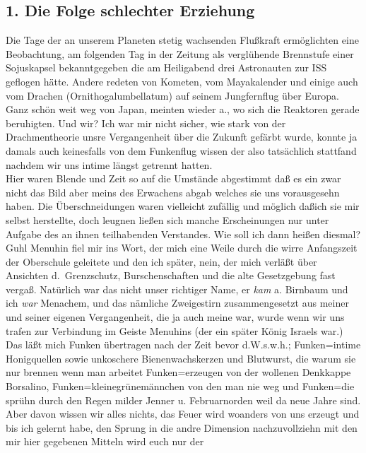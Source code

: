 \documentclass[
]{article}
\author{}
\date{\vspace{-2.5em}}
\begin{document}
\subsection{1. Die Folge schlechter
Erziehung}\label{die-folge-schlechter-erziehung}

Die Tage der an unserem Planeten stetig wachsenden Flußkraft
ermöglichten eine Beobachtung, am folgenden Tag in der Zeitung als
verglühende Brennstufe einer Sojuskapsel bekanntgegeben die am
Heiligabend drei Astronauten zur ISS geflogen hätte. Andere redeten von
Kometen, vom Mayakalender und einige auch vom Drachen
(Ornithogalumbellatum) auf seinem Jungfernflug über Europa. Ganz schön
weit weg von Japan, meinten wieder a., wo sich die Reaktoren gerade
beruhigten. Und wir? Ich war mir nicht sicher, wie stark von der
Drachmentheorie unsre Vergangenheit über die Zukunft gefärbt wurde,
konnte ja damals auch keinesfalls von dem Funkenflug wissen der also
tatsächlich stattfand nachdem wir uns intime längst getrennt hatten.\\
Hier waren Blende und Zeit so auf die Umstände abgestimmt daß es ein
zwar nicht das Bild aber meins des Erwachens abgab welches sie uns
vorausgesehn haben. Die Überschneidungen waren vielleicht zufällig und
möglich daßich sie mir selbst herstellte, doch leugnen ließen sich
manche Erscheinungen nur unter Aufgabe des an ihnen teilhabenden
Verstandes. Wie soll ich dann heißen diesmal?\\
Guhl Menuhin fiel mir ins Wort, der mich eine Weile durch die wirre
Anfangszeit der Oberschule geleitete und den ich später, nein, der mich
verläßt über Ansichten d.~Grenzschutz, Burschenschaften und die alte
Gesetzgebung fast vergaß. Natürlich war das nicht unser richtiger Name,
er \emph{kam} a. Birnbaum und ich \emph{war} Menachem, und das nämliche
Zweigestirn zusammengesetzt aus meiner und seiner eigenen Vergangenheit,
die ja auch meine war, wurde wenn wir uns trafen zur Verbindung im
Geiste Menuhins (der ein später König Israels war.) Das läßt mich Funken
übertragen nach der Zeit bevor d.W.s.w.h.; Funken=intime Honigquellen
sowie unkoschere Bienenwachskerzen und Blutwurst, die warum sie nur
brennen wenn man arbeitet Funken=erzeugen von der wollenen Denkkappe
Borsalino, Funken=kleinegrünemännchen von den man nie weg und Funken=die
sprühn durch den Regen milder Jenner u. Februarnorden weil da neue Jahre
sind. Aber davon wissen wir alles nichts, das Feuer wird woanders von
uns erzeugt und bis ich gelernt habe, den Sprung in die andre Dimension
nachzuvollziehn mit den mir hier gegebenen Mitteln wird euch nur der
\end{document}
